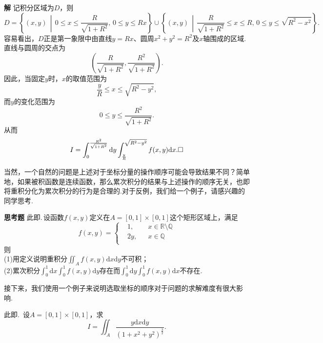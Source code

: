 \documentclass{ctexart}
\newenvironment{custom}[1]{\par\noindent \textbf{#1}\quad}{\par\vspace{1em}}
\begin{document}
\begin{custom}{解}
记积分区域为$D$，则
$$D=\left\{(x,y)\,\middle|\,0\leqslant x\leqslant \frac{R}{\sqrt{1+R^{2}}},\,0\leqslant y\leqslant Rx\right\}
\cup
\left\{(x,y)\,\middle|\,\frac{R}{\sqrt{1+R^{2}}}\leqslant x\leqslant R,\,0\leqslant y\leqslant \sqrt{R^{2}-x^{2}}\right\}.$$
容易看出，$D$正是第一象限中由直线$y=Rx$、圆周$x^{2}+y^{2}=R^{2}$及$x$轴围成的区域. 直线与圆周的交点为
$$\left(\frac{R}{\sqrt{1+R^{2}}},\frac{R^{2}}{\sqrt{1+R^{2}}}\right).$$
因此，当固定$y$时，$x$的取值范围为
$$\frac{y}{R}\leqslant x\leqslant \sqrt{R^{2}-y^{2}},$$
而$y$的变化范围为
$$0\leqslant y\leqslant \frac{R^{2}}{\sqrt{1+R^{2}}}.$$
从而
$$I=\int_{0}^{\frac{R^{2}}{\sqrt{1+R^{2}}}}{\mathrm{d}y\int_{\frac{y}{R}}^{\sqrt{R^{2}-y^{2}}}{f(x,y)\mathrm{d}x}}.\hfill{\square}$$
\end{custom}

当然，一个自然的问题是上述对于坐标分量的操作顺序可能会导致结果不同？简单地，如果被积函数是连续函数，那么累次积分的结果与上述操作的顺序无关，也即将重积分化为累次积分的行为是合理的.对于反例，我们给一个例子，请感兴趣的同学思考.

\begin{custom}{思考题}
此即\cite[例题22.2.2]{XHM}.\,设函数$f(x,y)$定义在$A=[0,1]\times[0,1]$这个矩形区域上，满足
$$f(x,y)=\left\{\begin{aligned}&1, &&x\in\mathbb{R}\setminus\mathbb{Q}\\ &2y, &&x\in \mathbb{Q}\\\end{aligned}\right.$$
则\\
(1)用定义说明重积分$\iint_{A}{f(x,y)\mathrm{d}x\mathrm{d}y}$不可积；\\
(2)累次积分$\int_{0}^{1}{\mathrm{d}x\int_{0}^{1}{f(x,y)\mathrm{d}y}}$存在而$\int_{0}^{1}{\mathrm{d}y\int_{0}^{1}{f(x,y)\mathrm{d}x}}$不存在.
\end{custom}

接下来，我们使用一个例子来说明选取坐标的顺序对于问题的求解难度有很大影响.
\begin{example}
此即\cite[例题22.2.1]{XHM}.\, 设$A=[0,1]\times[0,1]$，求
$$I=\iint_{A}{\frac{y\mathrm{d}x\mathrm{d}y}{(1+x^{2}+y^{2})^{\frac{3}{2}}}}.$$
\end{example}
\end{document}
